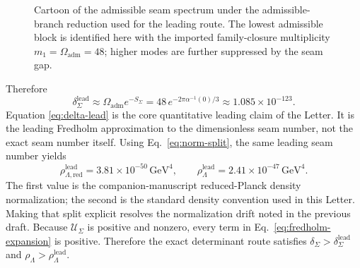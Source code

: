 \documentclass[aps,prl,reprint,superscriptaddress,longbibliography,nofootinbib,floatfix]{revtex4-2}
\newcommand{\Oadm}{\Omega_{\mathrm{adm}}}
\newcommand{\Seam}{\Sigma}
\newcommand{\USeam}{\mathcal U_{\Seam}}
\newcommand{\rhoLambda}{\rho_{\Lambda}}
\newcommand{\rhoLambdaRed}{\rho_{\Lambda,\mathrm{red}}}
\begin{document}
\begin{figure}[t]
\centering
{}
\caption{Cartoon of the admissible seam spectrum under the admissible-branch reduction used for the leading route. The lowest admissible block is identified here with the imported family-closure multiplicity $m_1=\Oadm=48$; higher modes are further suppressed by the seam gap.}
\label{fig:seam-spectrum}
\end{figure}

Therefore
\begin{equation}
\delta_{\Seam}^{\mathrm{lead}}
\approx
\Oadm e^{-S_{\Seam}}
=
48\,e^{-2\pi\alpha^{-1}(0)/3}
\approx
1.085\times10^{-123}.
\label{eq:delta-lead}
\end{equation}
Equation \eqref{eq:delta-lead} is the core quantitative leading claim of the Letter. It is the leading Fredholm approximation to the dimensionless seam number, not the exact seam number itself. Using Eq.~\eqref{eq:norm-split}, the same leading seam number yields
\begin{equation}
\rhoLambdaRed^{\mathrm{lead}}
=
3.81\times10^{-50}\,\mathrm{GeV}^4,
\qquad
\rhoLambda^{\mathrm{lead}}
=
2.41\times10^{-47}\,\mathrm{GeV}^4.
\label{eq:lead-densities}
\end{equation}
The first value is the companion-manuscript reduced-Planck density normalization; the second is the standard density convention used in this Letter. Making that split explicit resolves the normalization drift noted in the previous draft. Because $\USeam$ is positive and nonzero, every term in Eq.~\eqref{eq:fredholm-expansion} is positive. Therefore the exact determinant route satisfies $\delta_{\Seam}>\delta_{\Seam}^{\mathrm{lead}}$ and $\rhoLambda>\rhoLambda^{\mathrm{lead}}$.
\end{document}
